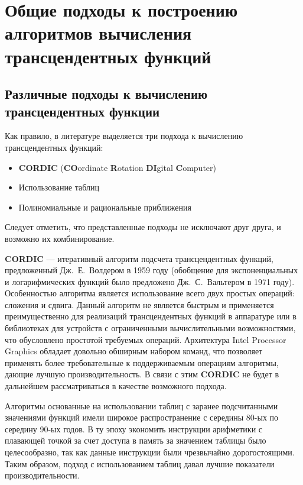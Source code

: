\chapter{Общие подходы к построению алгоритмов вычисления трансцендентных функций}

\section{Различные подходы к вычислению трансцендентных функции}

Как правило, в литературе выделяется три подхода к вычислению трансцендентных функций\cite{goldberg,muller}: 

\begin{itemize}
    \item \textbf{CORDIC} (\foreignlanguage{english}{\textbf{CO}ordinate \textbf{R}otation \textbf{DI}gital \textbf{C}omputer})
    \item Использование таблиц
    \item Полиномиальные и рациональные приближения
\end{itemize}

Следует отметить, что представленные подходы не исключают друг друга, и возможно их комбинирование.

\textbf{CORDIC} --- итеративный алгоритм подсчета трансцендентных функций, предложенный Дж.~Е.~Волдером в 1959 году (обобщение для экспоненциальных и логарифмических функций было предложено Дж.~С.~Вальтером в 1971 году).
Особенностью алгоритма является использование всего двух простых операций: сложения и сдвига.
Данный алгоритм не является быстрым и применяется преимущественно для реализаций трансцендентных функций в аппаратуре или в библиотеках для устройств с ограниченными вычислительными возможностями, что обусловлено простотой требуемых операций\cite[с.~133]{muller}.
Архитектура \foreignlanguage{english}{Intel Processor Graphics} обладает довольно обширным набором команд, что позволяет применять более требовательные к поддерживаемым операциям алгоритмы, дающие лучшую производительность. В связи с этим \textbf{CORDIC} не будет в дальнейшем рассматриваться в качестве возможного подхода.

Алгоритмы основанные на использовании таблиц с заранее подсчитанными значениями функций имели широкое распространение с середины 80-ых по середину 90-ых годов.
В ту эпоху экономить инструкции арифметики с плавающей точкой за счет доступа в память за значением таблицы было целесообразно, так как данные инструкции были чрезвычайно дорогостоящими.
Таким образом, подход с использованием таблиц давал лучшие показатели производительности.

